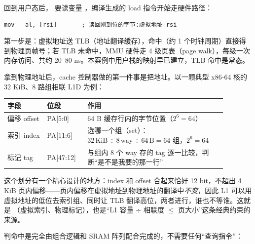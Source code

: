回到用户态后， 要读变量 ，编译生成的 load 指令开始走硬件路径：

\begin{lstlisting}
mov   al, [rsi]       ; 读回刚到位的字节:虚拟地址 rsi
\end{lstlisting}

第一步是：虚拟地址送 TLB（地址翻译缓存），命中（约 1 个时钟周期）直接得到物理页帧号；若 TLB 未命中，MMU 硬件走 4 级页表（page walk），每级一次内存访问、共约 20--80 ns。本案例中用户栈的映射早已建立，TLB 命中是常态。

拿到物理地址后，cache 控制器做的第一件事是把地址。以一颗典型 x86-64 核的 32 KiB、8 路组相联 L1D 为例：

\begin{longtable}{L{0.16\linewidth}L{0.16\linewidth}L{0.56\linewidth}}
\toprule
字段 & 位段 & 作用 \\
\midrule
偏移 offset & PA[5:0] & 64 B 缓存行内的字节位置（$2^6=64$） \\\tablerowrule
索引 index & PA[11:6] & 选哪一个组（set）：$32\,\text{KiB} \div 8\,\text{way} \div 64\,\text{B} = 64$ 组，$2^6=64$ \\\tablerowrule
标记 tag & PA[47:12] & 与组内 8 个 way 存的 tag 逐一比较，判断“是不是我要的那一行” \\
\bottomrule
\end{longtable}

这个划分有一个精心设计的地方：index 和 offset 合起来恰好 12 bit，不超出 4 KiB 页内偏移——页内偏移在虚拟地址到物理地址的翻译中\emph{不变}，因此 L1 可以用虚拟地址的低位去索引组、同时让 TLB 翻译高位，两者进行，谁也不等谁。这就是 （虚拟索引、物理标记），也是“L1 容量 $\div$ 相联度 $\le$ 页大小”这条经典约束的来源。

判命中是完全由组合逻辑和 SRAM 阵列配合完成的，不需要任何“查询指令”：

